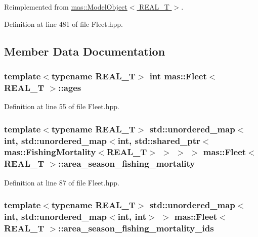 Reimplemented from \hyperlink{structmas_1_1_model_object_af40b3c89b11919fc5aea21dcf1cd027b}{mas\-::\-Model\-Object$<$ R\-E\-A\-L\-\_\-\-T $>$}.



Definition at line 481 of file Fleet.\-hpp.



\subsection{Member Data Documentation}
\hypertarget{structmas_1_1_fleet_adc63e3bd51a0e1897fba4c726f7ca8f8}{
\subsubsection[{ages}]{\setlength{\rightskip}{0pt plus 5cm}template$<$typename R\-E\-A\-L\-\_\-\-T$>$ int {\bf mas\-::\-Fleet}$<$ R\-E\-A\-L\-\_\-\-T $>$\-::ages}}\label{structmas_1_1_fleet_adc63e3bd51a0e1897fba4c726f7ca8f8}


Definition at line 55 of file Fleet.\-hpp.

\hypertarget{structmas_1_1_fleet_a5fbc6ef08467142e1797a26f557481e8}{
\subsubsection[{area\-\_\-season\-\_\-fishing\-\_\-mortality}]{\setlength{\rightskip}{0pt plus 5cm}template$<$typename R\-E\-A\-L\-\_\-\-T$>$ std\-::unordered\-\_\-map$<$int, std\-::unordered\-\_\-map$<$int, std\-::shared\-\_\-ptr$<${\bf mas\-::\-Fishing\-Mortality}$<$R\-E\-A\-L\-\_\-\-T$>$ $>$ $>$ $>$ {\bf mas\-::\-Fleet}$<$ R\-E\-A\-L\-\_\-\-T $>$\-::area\-\_\-season\-\_\-fishing\-\_\-mortality}}\label{structmas_1_1_fleet_a5fbc6ef08467142e1797a26f557481e8}


Definition at line 87 of file Fleet.\-hpp.

\hypertarget{structmas_1_1_fleet_a31e805b1616d5a216530b48ea154c973}{
\subsubsection[{area\-\_\-season\-\_\-fishing\-\_\-mortality\-\_\-ids}]{\setlength{\rightskip}{0pt plus 5cm}template$<$typename R\-E\-A\-L\-\_\-\-T$>$ std\-::unordered\-\_\-map$<$int, std\-::unordered\-\_\-map$<$int, int$>$ $>$ {\bf mas\-::\-Fleet}$<$ R\-E\-A\-L\-\_\-\-T $>$\-::area\-\_\-season\-\_\-fishing\-\_\-mortality\-\_\-ids}}\label{structmas_1_1_fleet_a31e805b1616d5a216530b48ea154c973}



